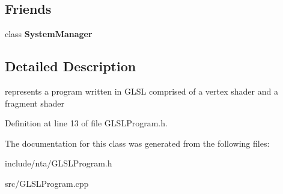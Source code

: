 \subsection*{Friends}
\begin{DoxyCompactItemize}
\item 
\mbox{\label{classnta_1_1GLSLProgram_ab1ef2aa9992dd8ae85793e1a1f980e1e}} 
class {\bfseries System\+Manager}
\end{DoxyCompactItemize}


\subsection{Detailed Description}
represents a program written in G\+L\+SL comprised of a vertex shader and a fragment shader 

Definition at line 13 of file G\+L\+S\+L\+Program.\+h.



The documentation for this class was generated from the following files\+:\begin{DoxyCompactItemize}
\item 
include/nta/G\+L\+S\+L\+Program.\+h\item 
src/G\+L\+S\+L\+Program.\+cpp\end{DoxyCompactItemize}
